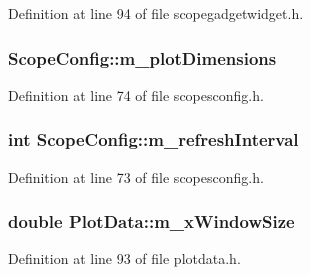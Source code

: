 \-Definition at line 94 of file scopegadgetwidget.\-h.

\hypertarget{group___scope_plugin_ga5e011996b5bbb5da0ee8b193bb5073df}{
\subsubsection[{m\-\_\-plot\-Dimensions}]{ {\bf \-Scope\-Config\-::m\-\_\-plot\-Dimensions}}}\label{group___scope_plugin_ga5e011996b5bbb5da0ee8b193bb5073df}


\-Definition at line 74 of file scopesconfig.\-h.

\hypertarget{group___scope_plugin_gab29cf33842cdb51f7eba8bfccc93158e}{
\subsubsection[{m\-\_\-refresh\-Interval}]{\setlength{\rightskip}{0pt plus 5cm}int {\bf \-Scope\-Config\-::m\-\_\-refresh\-Interval}}}\label{group___scope_plugin_gab29cf33842cdb51f7eba8bfccc93158e}


\-Definition at line 73 of file scopesconfig.\-h.

\hypertarget{group___scope_plugin_gaf008f7f617cf48b623abbd095e483e10}{
\subsubsection[{m\-\_\-x\-Window\-Size}]{\setlength{\rightskip}{0pt plus 5cm}double {\bf \-Plot\-Data\-::m\-\_\-x\-Window\-Size}}}\label{group___scope_plugin_gaf008f7f617cf48b623abbd095e483e10}


\-Definition at line 93 of file plotdata.\-h.

